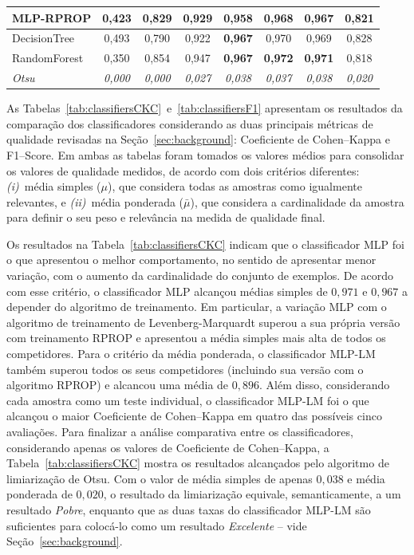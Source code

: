 \begin{table}[!b]
\begin{tabular}{l|c|c|c|c|c||c|c}
MLP-RPROP     & 0,423 & 0,829 & 0,929 & 0,958 & 0,968  & 0,967 & 0,821 \\ \hline
DecisionTree         & 0,493 & 0,790 & 0,922 & \textbf{0,967} & 0,970  & 0,969 & 0,828 \\ \hline
RandomForest         & 0,350 & 0,854 & 0,947 & \textbf{0,967} & \textbf{0,972} & \textbf{0,971} & 0,818\\ \hline \hline
\textit{Otsu} & \textit{0,000} & \textit{0,000} & \textit{0,027} & \textit{0,038} & \textit{0,037}  & \textit{0,038} & \textit{0,020} \\ \hline\hline
\end{tabular}
\end{table}

As Tabelas~\ref{tab:classifiersCKC}~e~\ref{tab:classifiersF1} apresentam os resultados da comparação dos classificadores considerando as duas principais métricas de qualidade revisadas na Seção~\ref{sec:background}: Coeficiente de Cohen--Kappa e F1--Score.
Em ambas as tabelas foram tomados os valores médios para consolidar os valores de qualidade medidos, de acordo com dois critérios diferentes: 
\textit{(i)}~média simples ($\mu$), que considera todas as amostras como igualmente relevantes, e
\textit{(ii)}~média ponderada ($\bar{\mu}$), que considera a cardinalidade da amostra para definir o seu peso e relevância na medida de qualidade final.

Os resultados na Tabela~\ref{tab:classifiersCKC} indicam que o classificador MLP foi o que apresentou o melhor comportamento, no sentido de apresentar menor variação, com o aumento da cardinalidade do conjunto de exemplos.
De acordo com esse critério, o classificador MLP alcançou médias simples de $0,971$ e $0,967$ a depender do algoritmo de treinamento.
Em particular, a variação MLP com o algoritmo de treinamento de Levenberg-Marquardt superou a sua própria versão com treinamento RPROP e apresentou a média simples mais alta de todos os competidores.
Para o critério da média ponderada, o classificador MLP-LM também superou todos os seus competidores (incluindo sua versão com o algoritmo RPROP) e alcancou uma média de $0,896$.
Além disso, considerando cada amostra como um teste individual, o classificador MLP-LM foi o que alcançou o maior Coeficiente de Cohen--Kappa em quatro das possíveis cinco avaliações.
Para finalizar a análise comparativa entre os classificadores, considerando apenas os valores de Coeficiente de Cohen--Kappa, a Tabela~\ref{tab:classifiersCKC} mostra os resultados alcançados pelo algoritmo de limiarização de Otsu.
Com o valor de média simples de apenas $0,038$ e média ponderada de $0,020$, o resultado da limiarização equivale, semanticamente, a um resultado \textit{Pobre}, enquanto que as duas taxas do classificador MLP-LM são suficientes para colocá-lo como um resultado \textit{Excelente} -- vide Seção~\ref{sec:background}.


